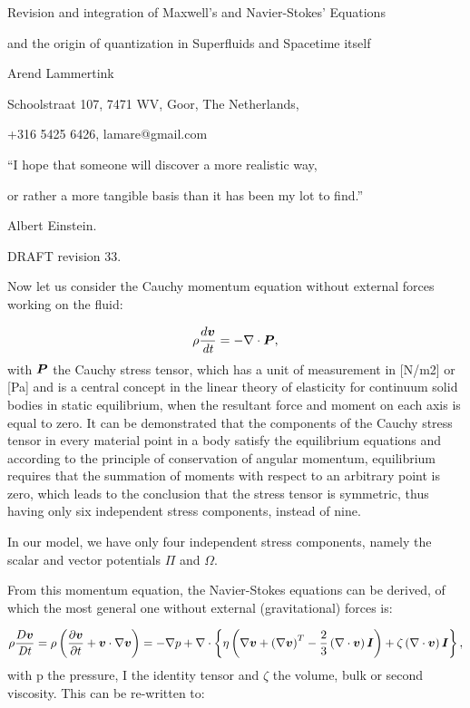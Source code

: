 \documentclass{article}
\title{}
\author{}
\date{2022-11-20}
\newcommand\boldsubformula[1]{\text{\mathversion{bold}$#1$}}
\begin{document}
Revision and integration of Maxwell's and Navier-Stokes' Equations 

and the origin of quantization in Superfluids and Spacetime itself

Arend Lammertink

Schoolstraat 107, 7471 WV, Goor, The Netherlands,

+316 5425 6426, lamare@gmail.com

{}``I hope that someone will discover a more realistic way, 

or rather a more tangible basis than it has been my lot to find.''

Albert Einstein.

DRAFT revision 33. 





Now let us consider the Cauchy momentum equation without external forces working on the fluid:

\begin{equation}
\rho \frac{d\boldsubformula v}{\mathit{dt}}=-\nabla \cdot \boldsubformula P,
\end{equation}
with  $\boldsubformula P$  the Cauchy stress tensor, which has a unit of measurement in [N/m2] or [Pa] and is a central
concept in the linear theory of elasticity for continuum solid bodies in static equilibrium, when the resultant force
and moment on each axis is equal to zero. It can be demonstrated that the components of the Cauchy stress tensor in
every material point in a body satisfy the equilibrium equations and according to the principle of conservation of
angular momentum, equilibrium requires that the summation of moments with respect to an arbitrary point is zero, which
leads to the conclusion that the stress tensor is symmetric, thus having only six independent stress components,
instead of nine.

In our model, we have only four independent stress components, namely the scalar and vector potentials $\Pi $ and
$\Omega $.

From this momentum equation, the Navier-Stokes equations can be derived, of which the most general one without external
(gravitational) forces is:

\begin{equation}
\rho \frac{D\boldsubformula v}{\mathit{Dt}}=\rho \left(\frac{\partial \boldsubformula v}{\partial t}+\boldsubformula
v\cdot \nabla \boldsubformula v\right)=-\nabla p+\nabla \cdot \left\{\eta \left(\nabla \boldsubformula v+\left(\nabla
\boldsubformula v\right)^T-\frac 2 3\left(\nabla \cdot \boldsubformula v\right)\boldsubformula I\right)+\zeta
\left(\nabla \cdot \boldsubformula v\right)\boldsubformula I\right\},
\end{equation}
with p the pressure, I the identity tensor and  $\zeta $  the volume, bulk or second viscosity. This can be re-written
to:
\end{document}
